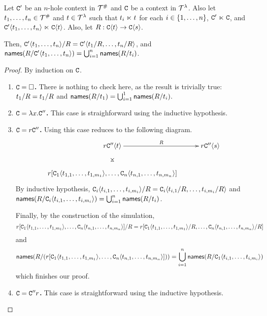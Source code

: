 \begin{lemma}
Let $\mathtt{C}'$ be an $n$-hole context in $\mathcal{T}^{\mathtt{\#}}$
and $\mathtt{C}$ be a context in $\mathcal{T}^{\lambda}$.
Also let $t_1, \hdots, t_n \in \mathcal{T}^{\mathtt{\#}}$ and $t \in \mathcal{T}^{\lambda}$
such that $t_i \mathrel{\ltimes} t$ for each $i \in \{1, \hdots, n\}$, $\mathtt{C}' \mathrel{\ltimes} \mathtt{C}$,
and $\mathtt{C}'\langle t_1, \hdots, t_n\rangle \mathrel{\ltimes} \mathtt{C}\langle t\rangle$.
Also, let $R : \mathtt{C}\langle t\rangle \to \mathtt{C}\langle s\rangle$.

Then, $\mathtt{C}'\langle t_1, \hdots, t_n\rangle / R = \mathtt{C}'\langle t_1 / R, \hdots, t_n / R\rangle$,
and $\mathsf{names}(R / \mathtt{C}'\langle t_1, \hdots, t_n\rangle) = \bigcup_{i=1}^n \mathsf{names}(R / t_i)$.
\end{lemma}
\begin{proof}
By induction on $\mathtt{C}$.
\begin{enumerate}
  \item {\bf $\mathtt{C} = \Box$.} There is nothing to check here, as the result is trivially true:
    $t_1 / R = t_1 / R$ and $\mathsf{names}(R / t_1) = \bigcup_{i=1}^1 \mathsf{names}(R / t_i)$.
  \item {\bf $\mathtt{C} = \lambda x. \mathtt{C}''$.} This case is straighforward using the inductive hypothesis.
  \item {\bf $\mathtt{C} = r \mathtt{C}''$.} Using  this case reduces to the following diagram.
    \[
    \xymatrix@C=1cm{
      \tmfour \con''\of{\tm} \ar@{}[d]|*=0[@]{\rtimes} \ar[r]^{\redex} & \tmfour \con''\of{\tmtwo} \\
     \tmfour [\con_1\of{\tm_{1,1}, \hdots, \tm_{1, m_1}}, \hdots, \con_n\of{\tm_{n,1}, \hdots, \tm_{n, m_n}}] & \\
    }
    \]
    By inductive hypothesis,
    $\mathtt{C}_i\langle t_{i,1}, \hdots, t_{i, m_i}\rangle / R = \mathtt{C}_i\langle t_{i,1} / R, \hdots, t_{i, m_i} / R\rangle$ and
    $\mathsf{names}(R / \mathtt{C}_i\langle t_{i, 1}, \hdots, t_{i, m_i}\rangle) = \bigcup_{i=1}^n \mathsf{names}(R / t_i)$.

    Finally, by the construction of the simulation,
    \[r [\mathtt{C}_1\langle t_{1,1}, \hdots, t_{1, m_1}\rangle, \hdots, \mathtt{C}_n\langle t_{n,1}, \hdots, t_{n, m_n}\rangle] / R =
     r [\mathtt{C}_1\langle t_{1,1}, \hdots, t_{1, m_1}\rangle / R, \hdots, \mathtt{C}_n\langle t_{n,1}, \hdots, t_{n, m_n}\rangle / R]\]
     and
     \[\mathsf{names}(R / (r [\mathtt{C}_1\langle t_{1,1}, \hdots, t_{1, m_1}\rangle, \hdots, \mathtt{C}_n\langle t_{n,1}, \hdots, t_{n, m_n}\rangle])) = \bigcup_{i=1}^n \mathsf{names}(R / \mathtt{C}_1\langle t_{i,1}, \hdots, t_{i, m_i}\rangle)\]
    which finishes our proof.
  \item {\bf $\mathtt{C} = \mathtt{C}'' r$.} This case is straightforward using the inductive hypothesis.
\end{enumerate}
\end{proof}
